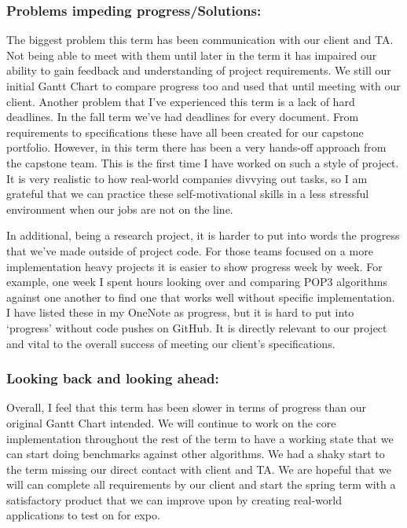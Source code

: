 \subsubsection{Problems impeding progress/Solutions:}       
The biggest problem this term has been communication with our client and TA. Not being able to meet with them until later in the term it has impaired our ability to gain feedback and understanding of project requirements. We still our initial Gantt Chart to compare progress too and used that until meeting with our client. Another problem that I’ve experienced this term is a lack of hard deadlines. In the fall term we’ve had deadlines for every document. From requirements to specifications these have all been created for our capstone portfolio. However, in this term there has been a very hands-off approach from the capstone team. This is the first time I have worked on such a style of project. It is very realistic to how real-world companies divvying out tasks, so I am grateful that we can practice these self-motivational skills in a less stressful environment when our jobs are not on the line.

In additional, being a research project, it is harder to put into words the progress that we’ve made outside of project code. For those teams focused on a more implementation heavy projects it is easier to show progress week by week. For example, one week I spent hours looking over and comparing POP3 algorithms against one another to find one that works well without specific implementation. I have listed these in my OneNote as progress, but it is hard to put into ‘progress’ without code pushes on GitHub. It is directly relevant to our project and vital to the overall success of meeting our client’s specifications.


\subsubsection{Looking back and looking ahead:} 
Overall, I feel that this term has been slower in terms of progress than our original Gantt Chart intended. We will continue to work on the core implementation throughout the rest of the term to have a working state that we can start doing benchmarks against other algorithms. We had a shaky start to the term missing our direct contact with client and TA. We are hopeful that we will can complete all requirements by our client and start the spring term with a satisfactory product that we can improve upon by creating real-world applications to test on for expo.

